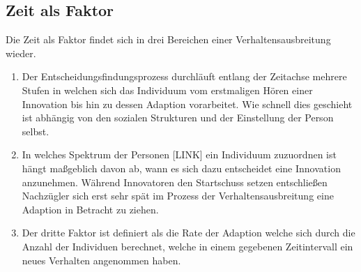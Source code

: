 \documentclass[12pt]{article}
\begin{document}
\subsection{Zeit als Faktor}
Die Zeit als Faktor findet sich in drei Bereichen einer Verhaltensausbreitung wieder.
\begin{enumerate}
\item Der Entscheidungsfindungsprozess durchläuft entlang der Zeitachse mehrere Stufen in welchen sich das Individuum vom erstmaligen Hören einer Innovation bis hin zu dessen Adaption vorarbeitet. Wie schnell dies geschieht ist abhängig von den sozialen Strukturen und der Einstellung der Person selbst.
\item In welches Spektrum der Personen [LINK] ein Individuum zuzuordnen ist hängt maßgeblich davon ab, wann es sich dazu entscheidet eine Innovation anzunehmen. Während Innovatoren den Startschuss setzen entschließen Nachzügler sich erst sehr spät im Prozess der Verhaltensausbreitung eine Adaption in Betracht zu ziehen.
\item Der dritte Faktor ist definiert als die Rate der Adaption welche sich durch die Anzahl der Individuen berechnet, welche in einem gegebenen Zeitintervall ein neues Verhalten angenommen haben.
\end{enumerate}
\end{document}
